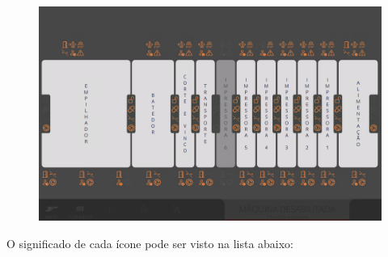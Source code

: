 \begin{figure}[h]
    \centering
    \includegraphics[width=384 px,height=240 px]{src/imagesICV/13-alarmsScreen/telaOverview.png}
  \end{figure}

O significado de cada ícone pode ser visto na lista abaixo:


